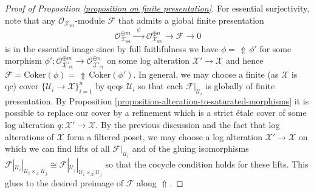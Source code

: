 \documentclass[11pt]{amsart}
\theoremstyle{definition}
\theoremstyle{definition}
\DeclareMathOperator{\arrowup}{\!\Uparrow \!}
\newcommand{\cU}{\mathcal{U}}
\newcommand{\ul}[1]{\underline{#1}}
\newcommand{\cal}{\mathcal}
\def\cU{{\cal U}}
\begin{document}
\begin{proof}[Proof of Proposition \ref{proposition on finite presentation}]
For essential surjectivity, note that any $\mathcal{O}_{\mathcal{X}_{\text{l\'et}}}$-module $\mathcal{F}$ that admits a global finite presentation 
\[
    \mathcal{O}_{\mathcal{X}_{\text{l\'et}}}^{\oplus m}\xrightarrow{\;\;\phi\;\;}\mathcal{O}_{\mathcal{X}_{\text{l\'et}}}^{\oplus n} \longrightarrow\mathcal{F}\longrightarrow 0
\]
is in the essential image since by full faithfulness we have $\phi=\arrowup \phi'$ for some morphism $\phi'\colon \mathcal{O}_{\ul{\mathcal{X}}{}'_{\text{\'et}}}^{\oplus m}\rightarrow\mathcal{O}_{\ul{\mathcal{X}}{}'_{\text{\'et}}}^{\oplus n}$ on some log alteration $\mathcal{X}'\rightarrow \mathcal{X}$ and hence $\mathcal{F} = \text{Coker}(\phi) = \arrowup \text{Coker}(\phi')$. In general, we may choose a finite (as $\mathcal{X}$ is qc) cover $\{\cU_i\rightarrow \mathcal{X}\}_{i=1}^n$ by qcqs $\cU_i$ so that each $\mathcal{F}|_{\cU_i}$ is globally of finite presentation. By Proposition \ref{proposition-alteration-to-saturated-morphisms} it is possible to replace our cover by a refinement which is a strict \'etale cover of some log alteration $q\colon \mathcal{X}'\rightarrow \mathcal{X}$. By the previous discussion and the fact that log alterations of $\mathcal{X}$ form a filtered poset, we may choose a log alteration $\mathcal{X}'\rightarrow \mathcal{X}$ on which we can find lifts of all $\mathcal{F}|_{\cU_i}$ and of the gluing isomorphisms $\mathcal{F}|_{\cU_i}|_{\cU_i\times_\mathcal{X} \cU_j}\cong \mathcal{F}|_{\cU_j}|_{\cU_i\times_\mathcal{X} \cU_j}$ so that the cocycle condition holds for these lifts. This glues to the desired preimage of $\mathcal{F}$ along $\Uparrow$.
\end{proof}
\end{document}
